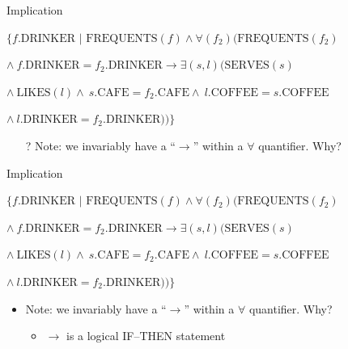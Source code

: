 \documentclass[aspectratio=169]{beamer}
\begin{document}
\begin{frame}{Implication}

$\{f.\textrm{DRINKER } | \textrm{ FREQUENTS}(f) \wedge \forall(f_2)(\textrm{FREQUENTS}(f_2)$

\hspace{2em}$\wedge\ f.\textrm{DRINKER} = f_2.\textrm{DRINKER} \rightarrow \exists(s, l)(\textrm{SERVES}(s)$

\hspace{2em}$ \wedge\ \textrm{LIKES}(l) \wedge\ s.\textrm{CAFE} = f_2.\textrm{CAFE} \wedge\ l.\textrm{COFFEE} = s.\textrm{COFFEE}$

\hspace{2em}$\wedge\	l.\textrm{DRINKER} = f_2.\textrm{DRINKER}))\}$

\begin{itemize}
\item[?] Note: we invariably have a ``$\rightarrow$'' within a $\forall$ quantifier.  Why?
\end{itemize}
\end{frame}
\begin{frame}{Implication}

$\{f.\textrm{DRINKER } | \textrm{ FREQUENTS}(f) \wedge \forall(f_2)(\textrm{FREQUENTS}(f_2)$

\hspace{2em}$\wedge\ f.\textrm{DRINKER} = f_2.\textrm{DRINKER} \rightarrow \exists(s, l)(\textrm{SERVES}(s)$

\hspace{2em}$ \wedge\ \textrm{LIKES}(l) \wedge\ s.\textrm{CAFE} = f_2.\textrm{CAFE} \wedge\ l.\textrm{COFFEE} = s.\textrm{COFFEE}$

\hspace{2em}$\wedge\	l.\textrm{DRINKER} = f_2.\textrm{DRINKER}))\}$

\begin{itemize}
\item Note: we invariably have a ``$\rightarrow$'' within a $\forall$ quantifier.  Why?
\begin{itemize}
\item $\rightarrow$ is a logical IF--THEN statement
\end{itemize}
\end{itemize}
\end{frame}
\end{document}
